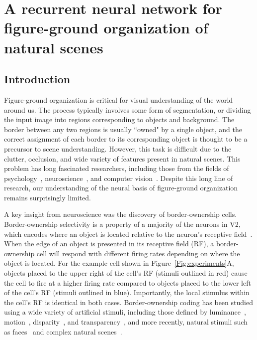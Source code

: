 \chapter{A recurrent neural network for figure-ground organization of natural scenes}
\label{sec:natural_image}

\section{Introduction}

Figure-ground organization is critical for visual understanding of the world around us. The process typically involves some form of segmentation, or dividing the input image into regions corresponding to objects and background. The border between any two regions is usually ``owned" by a single object, and the correct assignment of each border to its corresponding object is thought to be a precursor to scene understanding. However, this task is difficult due to the clutter, occlusion, and wide variety of features present in natural scenes. This problem has long fascinated researchers, including those from the fields of psychology~\citep{Wertheimer23,Koffka35}, neuroscience~\citep{Zhou_etal00,Craft_etal07}, and computer vision~\citep{Sajda_Finkel95,Ren_etal06,Teo_etal15,Wang_Yuille16}.
Despite this long line of research, our understanding of the neural basis of figure-ground organization remains surprisingly limited.

A key insight from neuroscience was the discovery of border-ownership
cells. Border-ownership selectivity is a property of a majority of the
neurons in V2, which encodes where an object is located relative to the
neuron's receptive field~\citep{Zhou_etal00}. When the edge of an object is presented in its receptive field (RF), a border-ownership cell will respond with different firing rates depending on where the object is located. For the example cell shown in Figure~\ref{Fig:experiments}A, objects placed to the upper right of the cell's RF (stimuli outlined in red) cause the cell to fire at a higher firing rate compared to objects placed to the lower left of the cell's RF (stimuli outlined in blue). Importantly, the local stimulus within the cell's RF is identical in both cases. Border-ownership coding has been studied using a wide variety of artificial stimuli, including those defined by luminance~\citep{Zhou_etal00}, motion~\citep{vonderHeydt_etal03a}, disparity~\citep{Qiu_vonderHeydt05}, and transparency~\citep{Qiu_vonderHeydt07}, and more recently, natural stimuli such as faces~\citep{Hesse_Tsao16,Ko_vonderHeydt17} and complex natural scenes~\citep{Williford_vonderHeydt16}.

